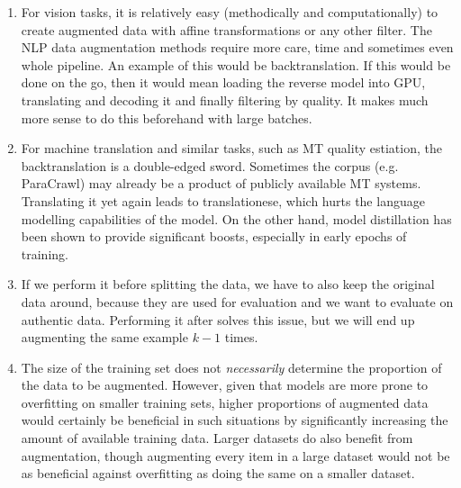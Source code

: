 \begin{exercise}

\begin{enumerate}
    \item For vision tasks, it is relatively easy (methodically and computationally) to create augmented data with affine transformations or any other filter. The NLP data augmentation methods require more care, time and sometimes even whole pipeline. An example of this would be backtranslation. If this would be done on the go, then it would mean loading the reverse model into GPU, translating and decoding it and finally filtering by quality. It makes much more sense to do this beforehand with large batches.
    \item For machine translation and similar tasks, such as MT quality estiation, the backtranslation is a double-edged sword. Sometimes the corpus (e.g. ParaCrawl) may already be a product of publicly available MT systems. Translating it yet again leads to translationese, which hurts the language modelling capabilities of the model. On the other hand, model distillation has been shown to provide significant boosts, especially in early epochs of training. 
    \item If we perform it before splitting the data, we have to also keep the original data around, because they are used for evaluation and we want to evaluate on authentic data. Performing it after solves this issue, but we will end up augmenting the same example $k-1$ times.
    \item The size of the training set does not \textit{necessarily} determine the proportion of the data to be augmented. However, given that models are more prone to overfitting on smaller training sets, higher proportions of augmented data would certainly be beneficial in such situations by significantly increasing the amount of available training data. Larger datasets do also benefit from augmentation, though augmenting every item in a large dataset would not be as beneficial against overfitting as doing the same on a smaller dataset.
\end{enumerate}

\end{exercise}

